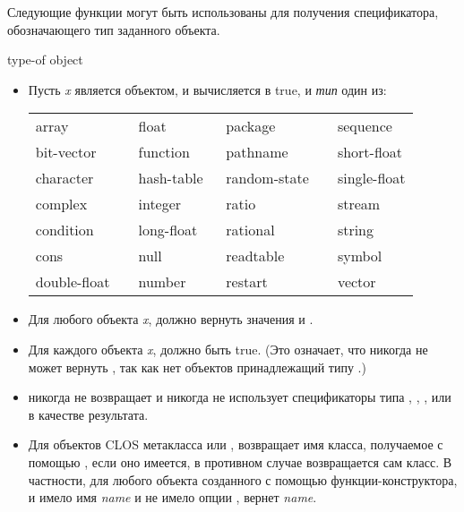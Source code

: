 Следующие функции могут быть использованы для получения спецификатора,
обозначающего тип заданного объекта.

\begin{defun}[Function]
type-of object


\begin{new}
\begin{itemize}
\item
Пусть \emph{x} является объектом, и 
вычисляется в true, и \emph{тип} один из:

\begin{flushleft}
\cf
\begin{tabular}{@{}llll@{}}
array          & float        & package        & sequence \\
bit-vector     & function     & pathname       & short-float \\
character      & hash-table   & random-state~~ & single-float \\
complex        & integer      & ratio          & stream \\
condition      & long-float~~ & rational       & string \\
cons           & null         & readtable      & symbol \\
double-float~~ & number       & restart        & vector
\end{tabular}
\end{flushleft}

\item
Для любого объекта \emph{x}, 
должно вернуть значения  и .

\item
Для каждого объекта \emph{x}, 
должно быть true. (Это означает, что  никогда не может вернуть
, так как нет объектов принадлежащий типу .)

\item
{} никогда не возвращает  и никогда не использует
спецификаторы типа , , ,  или  в
качестве результата.

\item
Для объектов CLOS метакласса  или ,
 возвращает имя класса, получаемое с помощью , если оно
имеется, в противном случае возвращается сам класс.
В частности, для любого объекта созданного с помощью 
функции-конструктора, и  имело имя \emph{name} и не имело опции
,  вернет \emph{name}.
\end{itemize}


\end{new}
\end{defun}
